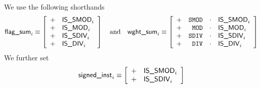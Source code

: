 We use the following shorthands
\[
	\textsf{flag\_sum}_{i}
	\equiv
	\left[ \begin{array}{cl}
		+ & \textsf{IS\_SMOD}    _{i}   \\
		+ & \textsf{IS\_MOD}     _{i}   \\
		+ & \textsf{IS\_SDIV}    _{i}   \\
		+ & \textsf{IS\_DIV}     _{i}   \\
	\end{array} \right]
	\quad\text{and}\quad
	\textsf{wght\_sum}_{i}
	\equiv
	\left[ \begin{array}{crcl}
		+ & \texttt{SMOD}           & \cdot & \textsf{IS\_SMOD}    _{i}   \\
		+ & \texttt{MOD}            & \cdot & \textsf{IS\_MOD}     _{i}   \\
		+ & \texttt{SDIV}           & \cdot & \textsf{IS\_SDIV}    _{i}   \\
		+ & \texttt{DIV}            & \cdot & \textsf{IS\_DIV}     _{i}   \\
	\end{array} \right]
\]
We further set
\[
	\textsf{signed\_inst}_{i}
	\equiv
	\left[ \begin{array}{cl}
		+ & \textsf{IS\_SMOD}    _{i}   \\
		+ & \textsf{IS\_SDIV}    _{i}   \\
	\end{array} \right]
\]
